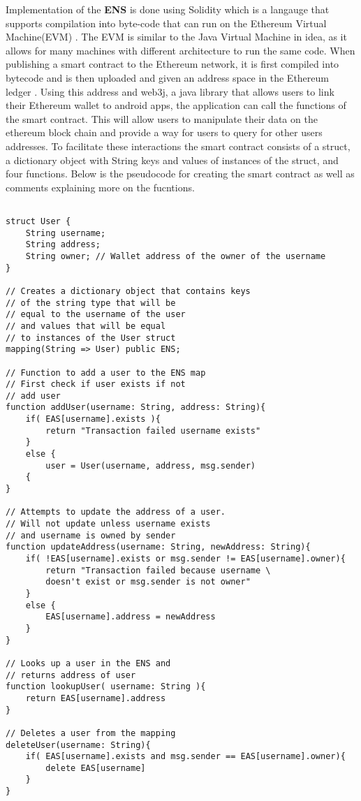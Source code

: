 \documentclass[../main/main.tex]{subfiles}
\begin{document}
Implementation of the \textbf{ENS} is done using Solidity which is a langauge that supports compilation into byte-code that can run on the Ethereum Virtual Machine(EVM) \cite{ETH}. 
The EVM is similar to the Java Virtual Machine in idea, as it allows for many machines with different architecture to run the same code. 
When publishing a smart contract to the Ethereum network, it is first compiled into bytecode and is then uploaded and given an address space in the Ethereum ledger \cite{ETH}. 
Using this address and web3j, a java library that allows users to link their Ethereum wallet to android apps, the application can call the functions of the smart contract. 
This will allow users to manipulate their data on the ethereum block chain and provide a way for users to query for other users addresses. 
To facilitate these interactions the smart contract consists of a struct, a dictionary object with String keys and values of instances of the struct, and four functions. 
Below is the pseudocode for creating the smart contract as well as comments explaining more on the fucntions. 

\begin{lstlisting}[caption={Psuedocode for ENS.}, label={lst:example6}]

struct User {
	String username;
	String address;
	String owner; // Wallet address of the owner of the username
}

// Creates a dictionary object that contains keys
// of the string type that will be 
// equal to the username of the user
// and values that will be equal
// to instances of the User struct
mapping(String => User) public ENS;

// Function to add a user to the ENS map
// First check if user exists if not
// add user
function addUser(username: String, address: String){
	if( EAS[username].exists ){
		return "Transaction failed username exists"
	} 
	else {
		user = User(username, address, msg.sender)
	{
}

// Attempts to update the address of a user.
// Will not update unless username exists
// and username is owned by sender
function updateAddress(username: String, newAddress: String){
	if( !EAS[username].exists or msg.sender != EAS[username].owner){
		return "Transaction failed because username \
		doesn't exist or msg.sender is not owner"
	} 
	else {
		EAS[username].address = newAddress
	}
}

// Looks up a user in the ENS and
// returns address of user
function lookupUser( username: String ){
	return EAS[username].address
}

// Deletes a user from the mapping
deleteUser(username: String){
	if( EAS[username].exists and msg.sender == EAS[username].owner){
		delete EAS[username]
	}
}

\end{lstlisting}
\end{document}
